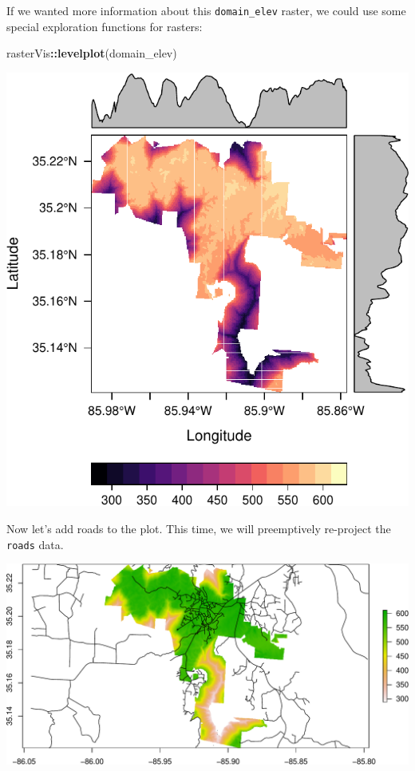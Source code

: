 \documentclass[]{book}
\newenvironment{Shaded}{\begin{snugshade}}{\end{snugshade}}
\newcommand{\KeywordTok}[1]{\textcolor[rgb]{0.13,0.29,0.53}{\textbf{#1}}}
\newcommand{\NormalTok}[1]{#1}
\newcommand{\OperatorTok}[1]{\textcolor[rgb]{0.81,0.36,0.00}{\textbf{#1}}}
\begin{document}
If we wanted more information about this \texttt{domain\_elev} raster, we could use some special exploration functions for rasters:

\begin{Shaded}
\begin{Highlighting}[]
\NormalTok{rasterVis}\OperatorTok{::}\KeywordTok{levelplot}\NormalTok{(domain_elev)}
\end{Highlighting}
\end{Shaded}

\includegraphics{figures/unnamed-chunk-658-1.pdf}

Now let's add roads to the plot. This time, we will preemptively re-project the \texttt{roads} data.

\includegraphics{figures/unnamed-chunk-659-1.pdf}
\end{document}

